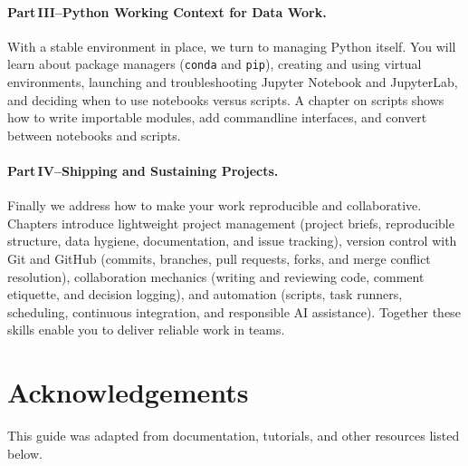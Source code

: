 \paragraph{Part\,III–Python Working Context for Data Work.}  With a stable environment in place, we turn to managing Python itself.  You will learn about package managers (\texttt{conda} and \texttt{pip}), creating and using virtual environments, launching and troubleshooting Jupyter Notebook and JupyterLab, and deciding when to use notebooks versus scripts.  A chapter on scripts shows how to write importable modules, add command\-line interfaces, and convert between notebooks and scripts.

\paragraph{Part\,IV–Shipping and Sustaining Projects.}  Finally we address how to make your work reproducible and collaborative.  Chapters introduce lightweight project management (project briefs, reproducible structure, data hygiene, documentation, and issue tracking), version control with Git and GitHub (commits, branches, pull requests, forks, and merge conflict resolution), collaboration mechanics (writing and reviewing code, comment etiquette, and decision logging), and automation (scripts, task runners, scheduling, continuous integration, and responsible AI assistance).  Together these skills enable you to deliver reliable work in teams.



\section{Acknowledgements}
This guide was adapted from documentation, tutorials, and other resources listed below.

